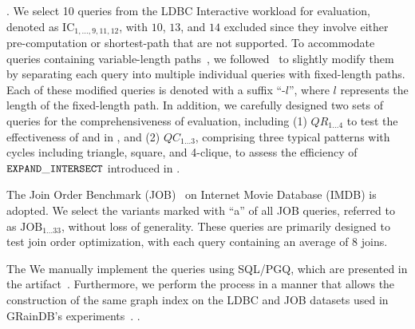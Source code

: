  .
    We select 10 queries from the LDBC Interactive workload for evaluation, denoted as $\text{IC}_{1, \ldots, 9, 11, 12}$, with $10$, $13$, and $14$ excluded since they involve either pre-computation or shortest-path that are not supported.
    To accommodate queries containing variable-length paths~\cite{graindb}, we followed~\cite{graindb} to slightly modify them by separating each query into multiple individual queries with fixed-length paths. Each of these modified queries is denoted with a suffix ``-$l$'', where $l$ represents the length of the fixed-length path. In addition, we carefully designed two sets of queries for the comprehensiveness of evaluation, including (1) $QR_{1\ldots 4}$ to test the effectiveness of \filterrule and \joinfuserule in \name, and (2) $QC_{1\ldots 3}$, comprising three typical patterns with cycles including triangle, square, and 4-clique, to assess the efficiency of $\texttt{EXPAND}\_\texttt{INTERSECT}$ introduced in .

 The Join Order Benchmark (JOB)~\cite{job_snb} on Internet Movie Database (IMDB) is adopted. We select the variants marked with ``a'' of all JOB queries, referred to as $\text{JOB}_{1\ldots 33}$, without loss of generality. These queries are primarily designed to test join order optimization, with each query containing an average of $8$ joins.

The 
We manually implement the queries using SQL/PGQ, which are presented in the artifact~\cite{artifact}.
Furthermore, we perform the \rgmapping process in a manner that allows the construction of the same graph index on the LDBC and JOB datasets used in GRainDB's experiments~\cite{graindb}.
.


